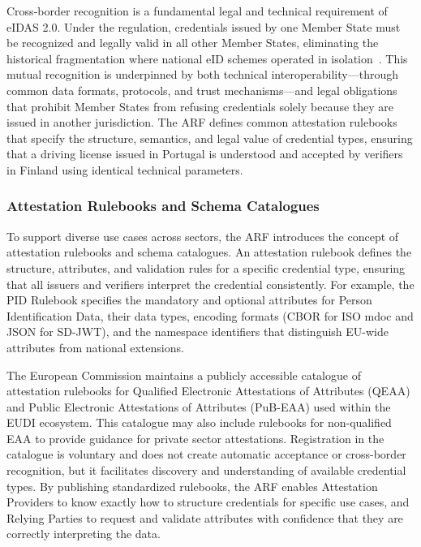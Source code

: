 \documentclass[sigconf,balance,nonacm,authordraft]{acmart}
\begin{document}
Cross-border recognition is a fundamental legal and technical requirement of eIDAS 2.0. Under the regulation, credentials issued by one Member State must be recognized and legally valid in all other Member States, eliminating the historical fragmentation where national eID schemes operated in isolation~\cite{Finextra_SSI_Differences}. This mutual recognition is underpinned by both technical interoperability—through common data formats, protocols, and trust mechanisms—and legal obligations that prohibit Member States from refusing credentials solely because they are issued in another jurisdiction. The ARF defines common attestation rulebooks that specify the structure, semantics, and legal value of credential types, ensuring that a driving license issued in Portugal is understood and accepted by verifiers in Finland using identical technical parameters.

\subsubsection{Attestation Rulebooks and Schema Catalogues}

To support diverse use cases across sectors, the ARF introduces the concept of attestation rulebooks and schema catalogues. An attestation rulebook defines the structure, attributes, and validation rules for a specific credential type, ensuring that all issuers and verifiers interpret the credential consistently. For example, the PID Rulebook specifies the mandatory and optional attributes for Person Identification Data, their data types, encoding formats (CBOR for ISO mdoc and JSON for SD-JWT), and the namespace identifiers that distinguish EU-wide attributes from national extensions.

The European Commission maintains a publicly accessible catalogue of attestation rulebooks for Qualified Electronic Attestations of Attributes (QEAA) and Public Electronic Attestations of Attributes (PuB-EAA) used within the EUDI ecosystem. This catalogue may also include rulebooks for non-qualified EAA to provide guidance for private sector attestations. Registration in the catalogue is voluntary and does not create automatic acceptance or cross-border recognition, but it facilitates discovery and understanding of available credential types. By publishing standardized rulebooks, the ARF enables Attestation Providers to know exactly how to structure credentials for specific use cases, and Relying Parties to request and validate attributes with confidence that they are correctly interpreting the data.
\end{document}
